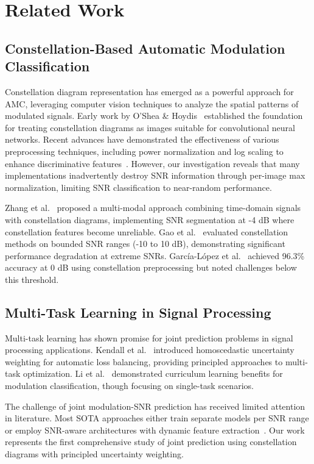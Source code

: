 \documentclass{ELSP}
\begin{document}
\section{Related Work}

\subsection{Constellation-Based Automatic Modulation Classification}

Constellation diagram representation has emerged as a powerful approach for AMC, leveraging computer vision techniques to analyze the spatial patterns of modulated signals. Early work by O'Shea \& Hoydis~\cite{7} established the foundation for treating constellation diagrams as images suitable for convolutional neural networks. Recent advances have demonstrated the effectiveness of various preprocessing techniques, including power normalization and log scaling to enhance discriminative features~\cite{8,9}. However, our investigation reveals that many implementations inadvertently destroy SNR information through per-image max normalization, limiting SNR classification to near-random performance.

Zhang et al.~\cite{1} proposed a multi-modal approach combining time-domain signals with constellation diagrams, implementing SNR segmentation at -4 dB where constellation features become unreliable. Gao et al.~\cite{2} evaluated constellation methods on bounded SNR ranges (-10 to 10 dB), demonstrating significant performance degradation at extreme SNRs. García-López et al.~\cite{3} achieved 96.3\% accuracy at 0 dB using constellation preprocessing but noted challenges below this threshold.

\subsection{Multi-Task Learning in Signal Processing}

Multi-task learning has shown promise for joint prediction problems in signal processing applications. Kendall et al.~\cite{5} introduced homoscedastic uncertainty weighting for automatic loss balancing, providing principled approaches to multi-task optimization. Li et al.~\cite{6} demonstrated curriculum learning benefits for modulation classification, though focusing on single-task scenarios.

The challenge of joint modulation-SNR prediction has received limited attention in literature. Most SOTA approaches either train separate models per SNR range or employ SNR-aware architectures with dynamic feature extraction~\cite{10}. Our work represents the first comprehensive study of joint prediction using constellation diagrams with principled uncertainty weighting.
\end{document}
